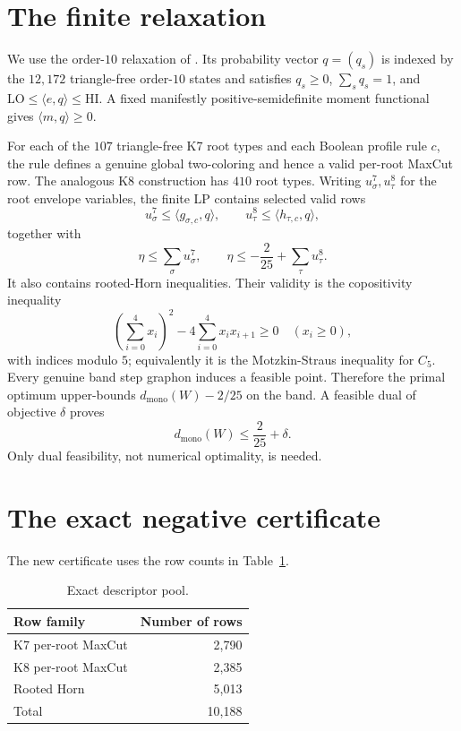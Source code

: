 \documentclass[11pt]{article}
\newcommand{\dmono}{d_{\mathrm{mono}}}
\begin{document}
\section{The finite relaxation}

We use the order-$10$ relaxation of \cite{Ferudun}.  Its probability vector
$q=(q_s)$ is indexed by the $12{,}172$ triangle-free order-$10$ states and
satisfies $q_s\ge0$, $\sum_s q_s=1$, and
$\mathrm{LO}\le\langle e,q\rangle\le\mathrm{HI}$.  A fixed manifestly
positive-semidefinite moment functional gives $\langle m,q\rangle\ge0$.

For each of the $107$ triangle-free K7 root types and each Boolean profile
rule $c$, the rule defines a genuine global two-coloring and hence a valid
per-root MaxCut row.  The analogous K8 construction has $410$ root types.
Writing $u^7_\sigma,u^8_\tau$ for the root envelope variables, the finite LP
contains selected valid rows
\[
 u^7_\sigma\le \langle g_{\sigma,c},q\rangle,
 \qquad
 u^8_\tau\le \langle h_{\tau,c},q\rangle,
\]
together with
\[
 \eta\le\sum_\sigma u^7_\sigma,
 \qquad
 \eta\le-\frac{2}{25}+\sum_\tau u^8_\tau.
\]
It also contains rooted-Horn inequalities.  Their validity is the
copositivity inequality
\[
  \left(\sum_{i=0}^4x_i\right)^2
      -4\sum_{i=0}^4x_ix_{i+1}\ge0
      \quad (x_i\ge0),
\]
with indices modulo $5$; equivalently it is the Motzkin-Straus inequality for
$C_5$.  Every genuine band step graphon induces a feasible point.  Therefore
the primal optimum upper-bounds
$\dmono(W)-2/25$ on the band.  A feasible dual of objective $\delta$ proves
\begin{equation}\label{eq:band-bound}
  \dmono(W)\le\frac{2}{25}+\delta.
\end{equation}
Only dual feasibility, not numerical optimality, is needed.

\section{The exact negative certificate}

The new certificate uses the row counts in Table~\ref{tab:rows}.

\begin{table}[ht]
\centering
\begin{tabular}{lr}
\toprule
Row family & Number of rows\\
\midrule
K7 per-root MaxCut & 2,790\\
K8 per-root MaxCut & 2,385\\
Rooted Horn & 5,013\\
\midrule
Total & 10,188\\
\bottomrule
\end{tabular}
\caption{Exact descriptor pool.}\label{tab:rows}
\end{table}
\end{document}
